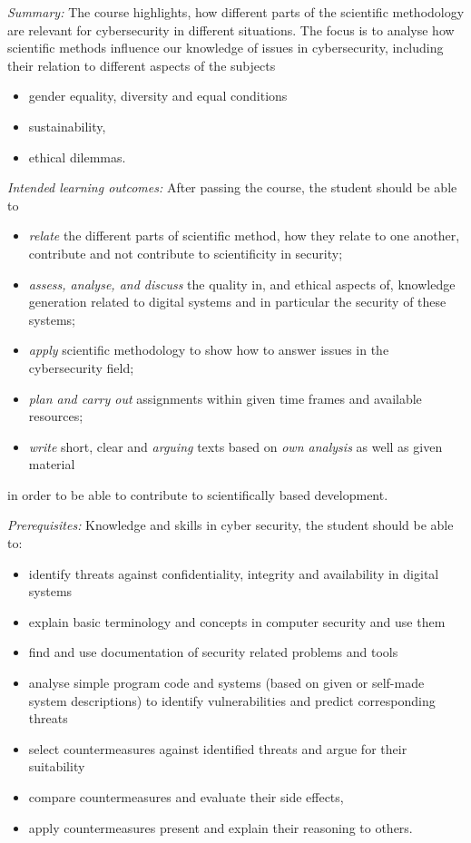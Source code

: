 \emph{Summary:}
The course highlights, how different parts of the scientific methodology are 
relevant for cybersecurity in different situations. The focus is to analyse how 
scientific methods influence our knowledge of issues in cybersecurity, 
including their relation to different aspects of the subjects
\begin{itemize}
  \item gender equality, diversity and equal conditions
  \item sustainability,
  \item ethical dilemmas.
\end{itemize}

\emph{Intended learning outcomes:}
After passing the course, the student should be able to
\begin{itemize}
  \item \emph{relate} the different parts of scientific method, how they relate 
    to one another, contribute and not contribute to scientificity in security;
  \item \emph{assess, analyse, and discuss} the quality in, and ethical aspects 
    of, knowledge generation related to digital systems and in particular the 
    security of these systems;
  \item \emph{apply} scientific methodology to show how to answer issues in the 
    cybersecurity field;
  \item \emph{plan and carry out} assignments within given time frames and 
    available resources;
  \item \emph{write} short, clear and \emph{arguing} texts based on \emph{own 
    analysis} as well as given material
\end{itemize}
in order to be able to contribute to scientifically based development.

\emph{Prerequisites:}
Knowledge and skills in cyber security, the student should be able to:
\begin{itemize}
  \item identify threats against confidentiality, integrity and availability in 
    digital systems
  \item explain basic terminology and concepts in computer security and use 
    them
  \item find and use documentation of security related problems and tools
  \item analyse simple program code and systems (based on given or self-made 
    system descriptions) to identify vulnerabilities and predict corresponding 
    threats
  \item select countermeasures against identified threats and argue for their 
    suitability
  \item compare countermeasures and evaluate their side effects,
  \item apply countermeasures present and explain their reasoning to others.
\end{itemize}

